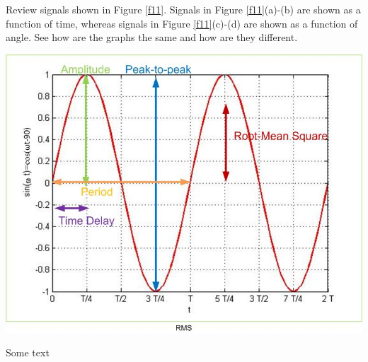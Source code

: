 \documentclass{ximera}
\begin{document}
Review signals shown in Figure \ref{f11}. Signals in Figure \ref{f11}(a)-(b) are shown as a function of time, whereas signals in Figure \ref{f11}(c)-(d) are shown as a function of angle. See how are the graphs the same and how are they different. 

\begin{image}
\includegraphics{../jpg/sinusoid.jpg}
\end{image} 

Some text
\end{document}
